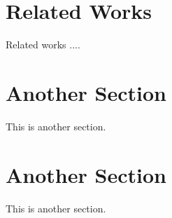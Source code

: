 \section{Related Works}
\label{sec:related}

Related works .... 



\section{Another Section}

This is another section. 

\section{Another Section}

This is another section. 